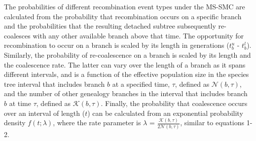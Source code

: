 \documentclass[11pt]{article}
\begin{document}




The probabilities of different recombination event types under the 
MS-SMC are calculated from the probability that recombination occurs on 
a specific branch and the probabilities that the resulting detached 
subtree subsequently re-coalesces with any other available branch above that time. 
The opportunity for recombination to occur on a branch is scaled by 
its length in generations ($t_b^u$ - $t_b^l$). Similarly, the 
probability of re-coalescence on a branch is scaled by its length
and the coalescence rate. The latter can vary over the length of a branch
as it spans different intervals, and is a function of the effective 
population size in the species tree interval that includes branch $b$ at
a specified time, $\tau$, defined as $\mathcal{N}(b,\tau)$, and the number of 
other genealogy branches in the interval that includes branch $b$ at time $\tau$,
defined as $\mathcal{K}(b,\tau)$.
Finally, the probability that coalescence occurs over an interval of length ($t$) 
can be calculated from an exponential probability density $f(t; \lambda)$, 
where the rate parameter is $\lambda$ = $\frac{\mathcal{K}(b,\tau)}{2\mathcal{N}(b,\tau)}$, 
similar to equations 1-2. 
\end{document}
